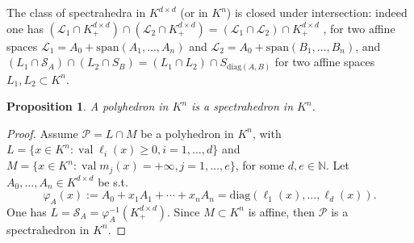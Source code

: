 \documentclass{elsarticle}
\theoremstyle{plain}
\newtheorem{proposition}[theorem]{Proposition}
\theoremstyle{definition}
\newcommand{\PP}{\mathcal{P}}
\renewcommand{\span}[1]{{\mathrm{span}(#1)}} %
\DeclareMathOperator{\val}{val}
\def\diag{\mathrm{diag}}
\begin{document}
The class of spectrahedra in $K^{d \times d}$ (or in $K^n$) is closed under intersection: indeed one
has $(\mathcal{L}_1 \cap K^{d \times d}_+) \cap (\mathcal{L}_2 \cap K^{d \times d}_+) =
(\mathcal{L}_1 \cap \mathcal{L}_2) \cap K^{d \times d}_+$
, for two affine spaces
$\mathcal{L}_1 = A_0+\span{A_1,\ldots,A_n}$ and $\mathcal{L}_2 = A_0+\span{B_1,\ldots,B_n}$,
and
$(L_1 \cap \mathcal{S}_A) \cap (L_2 \cap S_B) = (L_1\cap L_2) \cap S_{\diag(A,B)}$ for
two affine spaces $L_1,L_2 \subset K^n$.

\begin{proposition}
  A polyhedron in $K^n$ is a spectrahedron in $K^n$.
\end{proposition}
\begin{proof}
  Assume $\PP = L \cap M$ be a polyhedron in $K^n$, with
  $L = \{x \in K^n : \val \ell_i(x) \geq 0, i=1, \ldots, d\}$
  and $M = \{x \in K^n : \val m_j(x) = +\infty, j=1, \ldots, e\}$,
  for some $d, e \in \mathbb{N}$.
  Let $A_0,\ldots,A_n \in K^{d \times d}$ be s.t.
  $$
  \varphi_A(x) := A_0+x_1A_1+\cdots+x_nA_n = \diag(\ell_1(x), \ldots, \ell_d(x)).
  $$
  One has $L = \mathcal{S}_A = \varphi_A^{-1}(K^{d \times d}_+)$.
  Since $M \subset K^n$ is affine, then $\PP$ is a spectrahedron in $K^n$.
%
\end{proof}
\end{document}
